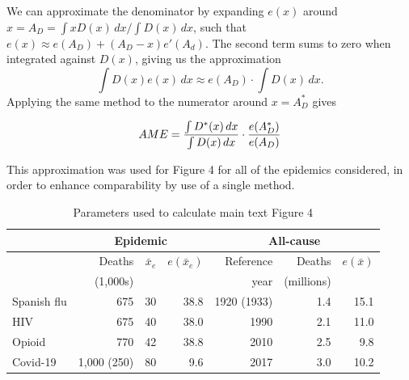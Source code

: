 \documentclass[9pt,twocolumn,twoside,lineno]{pnas-new}
\begin{document}
{We can approximate the denominator by expanding $e(x)$ around $x =
A_D = \int x D(x) \,dx / \int D(x)\,dx$, such that $e(x) \approx
e(A_D) + (A_D - x) e'(A_d)$. The second term sums to zero when
integrated against $D(x)$, giving us the approximation
\begin{equation}
  \int D(x) e(x) \,dx \approx  e(A_D) \cdot \int D(x) \, dx.
\end{equation}
Applying the same method to the numerator around $x = A^*_D$ gives

\begin{equation}
  AME = {\int D^*(x) \,dx \over \int D(x) \, dx} \cdot {e(A^*_D) \over e(A_D)}
\end{equation}

This approximation was used for Figure 4 for all of the epidemics
considered, in order to enhance comparability by use of a single
method.

\begin{table}[h]%
  \tiny
\centering
\caption{Parameters used to calculate main text Figure
  4}
\label{tbl:params}

\begin{tabular}{l|rrr|rrr}

  &   \multicolumn{3}{c|}{Epidemic} &  \multicolumn{3}{c}{All-cause} \\
\midrule
 & Deaths & $\bar{x}_e$    &  $e(\bar{x}_e)$ & Reference & Deaths &
                                                                 $e(\bar{x})$
                                                                 \\
  & (1,000s)       &      &           & year & (millions) &  \\     
\midrule
  Spanish flu & 675 & 30 & 38.8 & 1920 (1933) & 1.4 & 15.1 \\
  HIV         & 675 & 40 & 38.0 & 1990        & 2.1 & 11.0 \\
  Opioid &      770 & 42 & 38.8 & 2010        & 2.5 & 9.8 \\
  Covid-19 &    1,000 (250) & 80 & 9.6 & 2017        & 3.0 & 10.2 \\
\bottomrule
\end{tabular}
\normalsize

\end{table}



}
\end{document}
